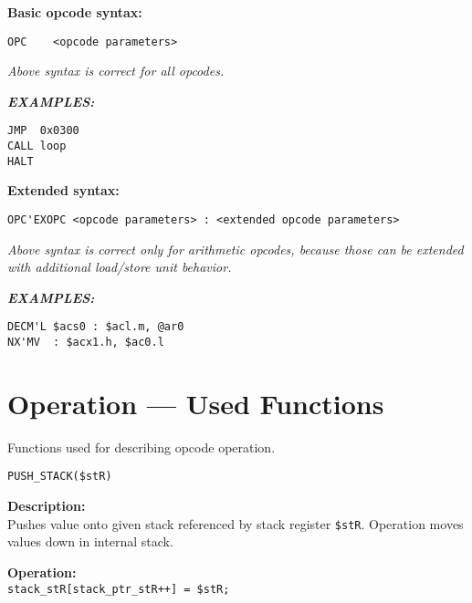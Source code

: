 \documentclass[oneside,english,a4paper,10pt,oneside,openany,final]{memoir}
\newcommand{\Code}[1]{\texttt{#1}}
\newcommand{\Function}[1]{\texttt{#1}}
\newcommand{\Register}[1]{\texttt{#1}}
\begin{document}
\vspace{3mm}
\textbf{Basic opcode syntax:}

\begin{lstlisting}[basicstyle=\ttfamily]
OPC    <opcode parameters>
\end{lstlisting}

\textit{Above syntax is correct for all opcodes.}
\vspace{5mm}

\textbf{\textit{EXAMPLES:}}
\begin{lstlisting}[basicstyle=\ttfamily]
JMP  0x0300
CALL loop
HALT
\end{lstlisting}

\vspace{5mm}

\textbf{Extended syntax:}

\begin{lstlisting}[basicstyle=\ttfamily]
OPC'EXOPC <opcode parameters> : <extended opcode parameters>
\end{lstlisting}

\textit{Above syntax is correct only for arithmetic opcodes, because those can be extended with additional load/store unit behavior.}
\vspace{5mm}

\textbf{\textit{EXAMPLES:}}
\begin{lstlisting}[basicstyle=\ttfamily]
DECM'L $acs0 : $acl.m, @ar0
NX'MV  : $acx1.h, $ac0.l
\end{lstlisting}

\pagebreak{}

\section{Operation --- Used Functions}

Functions used for describing opcode operation.

\begin{description}
  \item \Function{PUSH\_STACK(\$stR)}
  \begin{description}
	\item \textbf{Description:} \\ 
      Pushes value onto given stack referenced by stack register \Register{\$stR}. Operation moves values down in internal stack.

    \item \textbf{Operation:} \\
      \Code{stack\_stR[stack\_ptr\_stR++] = \$stR;}
  \end{description}
\end{description}
\end{document}
